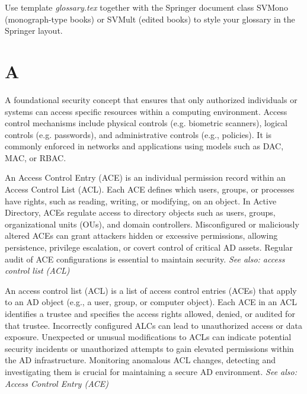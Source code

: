 %
%



Use template \emph{glossary.tex} together with the Springer document class SVMono (monograph-type books) or SVMult (edited books) to style your glossary in the Springer layout.

\section*{A}
 A foundational security concept that ensures that only authorized individuals or systems can access specific resources within a computing environment. Access control mechanisms include physical controls (e.g. biometric scanners), logical controls (e.g. passwords), and administrative controls (e.g., policies). It is commonly enforced in networks and applications using models such as DAC, MAC, or RBAC.

 An Access Control Entry (ACE) is an individual permission record within an Access Control List (ACL). Each ACE defines which users, groups, or processes have rights, such as reading, writing, or modifying, on an object. In Active Directory, ACEs regulate access to directory objects such as users, groups, organizational units (OUs), and domain controllers. Misconfigured or maliciously altered ACEs can grant attackers hidden or excessive permissions, allowing persistence, privilege escalation, or covert control of critical AD assets. Regular audit of ACE configurations is essential to maintain security.
\textit{See also: access control list (ACL)}

 An access control list (ACL) is a list of access control entries (ACEs) that apply to an AD object (e.g., a user, group, or computer object). Each ACE in an ACL identifies a trustee and specifies the access rights allowed, denied, or audited for that trustee. Incorrectly configured ALCs can lead to unauthorized access or data exposure. Unexpected or unusual modifications to ACLs can indicate potential security incidents or unauthorized attempts to gain elevated permissions within the AD infrastructure. Monitoring anomalous ACL changes, detecting and investigating them is crucial for maintaining a secure AD environment.
\textit{See also: Access Control Entry (ACE)}

